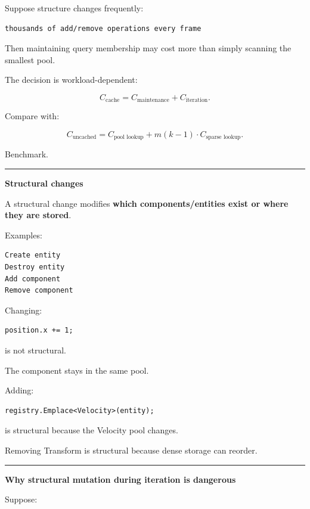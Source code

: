 Suppose structure changes frequently:

\begin{verbatim}
thousands of add/remove operations every frame
\end{verbatim}

Then maintaining query membership may cost more than simply scanning the smallest pool.

The decision is workload-dependent:

\[
C_{\text{cache}}
=
C_{\text{maintenance}}
+
C_{\text{iteration}}.
\]

Compare with:

\[
C_{\text{uncached}}
=
C_{\text{pool lookup}}
+
m(k-1)\cdot C_{\text{sparse lookup}}.
\]

Benchmark.

\begin{center}\rule{0.5\linewidth}{0.5pt}\end{center}

\textbf{Structural changes}

A structural change modifies \textbf{which components/entities exist or where they are stored}.

Examples:

\begin{verbatim}
Create entity
Destroy entity
Add component
Remove component
\end{verbatim}

Changing:

\begin{verbatim}
position.x += 1;
\end{verbatim}

is not structural.

The component stays in the same pool.

Adding:

\begin{verbatim}
registry.Emplace<Velocity>(entity);
\end{verbatim}

is structural because the Velocity pool changes.

Removing Transform is structural because dense storage can reorder.

\begin{center}\rule{0.5\linewidth}{0.5pt}\end{center}

\textbf{Why structural mutation during iteration is dangerous}

Suppose:

